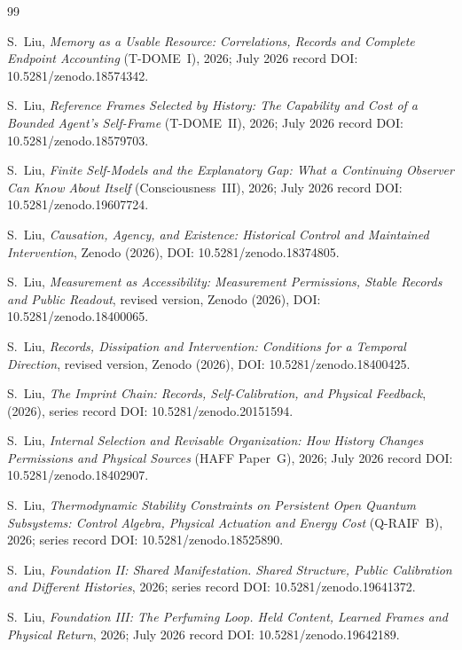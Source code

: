 \documentclass[12pt]{article}
\theoremstyle{definition}
\begin{document}
\begin{thebibliography}{99}

S.~Liu, \emph{Memory as a Usable Resource: Correlations, Records and Complete Endpoint Accounting} (T-DOME~I), 2026; July 2026 record DOI: 10.5281/zenodo.18574342.

S.~Liu, \emph{Reference Frames Selected by History: The Capability and Cost of a Bounded Agent's Self-Frame} (T-DOME~II), 2026; July 2026 record DOI: 10.5281/zenodo.18579703.

S.~Liu, \emph{Finite Self-Models and the Explanatory Gap: What a Continuing Observer Can Know About Itself} (Consciousness~III), 2026; July 2026 record DOI: 10.5281/zenodo.19607724.

S.~Liu, \emph{Causation, Agency, and Existence: Historical Control and Maintained Intervention}, Zenodo (2026), DOI: 10.5281/zenodo.18374805.

S.~Liu, \emph{Measurement as Accessibility: Measurement Permissions, Stable Records and Public Readout}, revised version, Zenodo (2026), DOI: 10.5281/zenodo.18400065.

S.~Liu, \emph{Records, Dissipation and Intervention: Conditions for a Temporal Direction}, revised version, Zenodo (2026), DOI: 10.5281/zenodo.18400425.

S.~Liu, \emph{The Imprint Chain: Records, Self-Calibration, and Physical Feedback}, (2026), series record DOI: 10.5281/zenodo.20151594.

S.~Liu, \emph{Internal Selection and Revisable Organization: How History Changes Permissions and Physical Sources} (HAFF Paper~G), 2026; July 2026 record DOI: 10.5281/zenodo.18402907.

S.~Liu, \emph{Thermodynamic Stability Constraints on Persistent Open Quantum Subsystems: Control Algebra, Physical Actuation and Energy Cost} (Q-RAIF~B), 2026; series record DOI: 10.5281/zenodo.18525890.

S.~Liu, \emph{Foundation II: Shared Manifestation. Shared Structure, Public Calibration and Different Histories}, 2026; series record DOI: 10.5281/zenodo.19641372.

S.~Liu, \emph{Foundation III: The Perfuming Loop. Held Content, Learned Frames and Physical Return}, 2026; July 2026 record DOI: 10.5281/zenodo.19642189.


\end{thebibliography}
\end{document}
